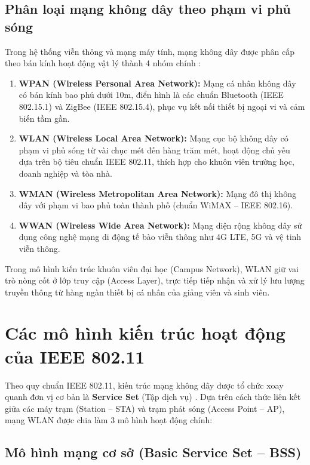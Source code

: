 \subsection{Phân loại mạng không dây theo phạm vi phủ sóng}

Trong hệ thống viễn thông và mạng máy tính, mạng không dây được phân cấp theo bán kính hoạt động vật lý thành 4 nhóm chính \cite{stallings2005wireless}:
\begin{enumerate}
    \item \textbf{WPAN (Wireless Personal Area Network):} Mạng cá nhân không dây có bán kính bao phủ dưới 10m, điển hình là các chuẩn Bluetooth (IEEE 802.15.1) và ZigBee (IEEE 802.15.4), phục vụ kết nối thiết bị ngoại vi và cảm biến tầm gần.
    \item \textbf{WLAN (Wireless Local Area Network):} Mạng cục bộ không dây có phạm vi phủ sóng từ vài chục mét đến hàng trăm mét, hoạt động chủ yếu dựa trên bộ tiêu chuẩn IEEE 802.11, thích hợp cho khuôn viên trường học, doanh nghiệp và tòa nhà.
    \item \textbf{WMAN (Wireless Metropolitan Area Network):} Mạng đô thị không dây với phạm vi bao phủ toàn thành phố (chuẩn WiMAX -- IEEE 802.16).
    \item \textbf{WWAN (Wireless Wide Area Network):} Mạng diện rộng không dây sử dụng công nghệ mạng di động tế bào viễn thông như 4G LTE, 5G và vệ tinh viễn thông.
\end{enumerate}

Trong mô hình kiến trúc khuôn viên đại học (Campus Network), WLAN giữ vai trò nòng cốt ở lớp truy cập (Access Layer), trực tiếp tiếp nhận và xử lý lưu lượng truyền thông từ hàng ngàn thiết bị cá nhân của giảng viên và sinh viên.

\section{Các mô hình kiến trúc hoạt động của IEEE 802.11}

Theo quy chuẩn IEEE 802.11, kiến trúc mạng không dây được tổ chức xoay quanh đơn vị cơ bản là \textbf{Service Set} (Tập dịch vụ) \cite{gast2005wireless}. Dựa trên cách thức liên kết giữa các máy trạm (Station -- STA) và trạm phát sóng (Access Point -- AP), mạng WLAN được chia làm 3 mô hình hoạt động chính:

\subsection{Mô hình mạng cơ sở (Basic Service Set -- BSS)}

